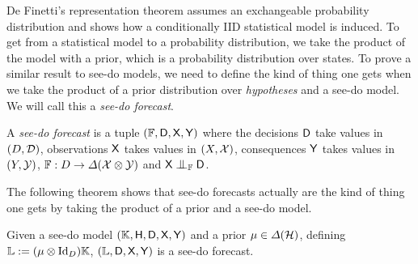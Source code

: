 De Finetti's representation theorem assumes an exchangeable probability distribution and shows how a conditionally IID statistical model is induced. To get from a statistical model to a probability distribution, we take the product of the model with a prior, which is a probability distribution over states. To prove a similar result to see-do models, we need to define the kind of thing one gets when we take the product of a prior distribution over \emph{hypotheses} and a see-do model. We will call this a \emph{see-do forecast}.

\begin{definition}\label{def:do_forecast}
A \emph{see-do forecast} is a tuple $(\mathbb{F},\mathsf{D},\mathsf{X},\mathsf{Y})$ where the decisions $\mathsf{D}$ take values in $(D,\mathcal{D})$, observations $\mathsf{X}$ takes values in $(X,\mathcal{X})$, consequences $\mathsf{Y}$ takes values in $(Y,\mathcal{Y})$, $\mathbb{F}:D\to \Delta(\mathcal{X}\otimes \mathcal{Y})$ and $\RV{X}\CI_{\kernel{F}}\RV{D}$.
\end{definition}

The following theorem shows that see-do forecasts actually are the kind of thing one gets by taking the product of a prior and a see-do model.

\begin{theorem}
Given a see-do model $(\mathbb{K},\mathsf{H},\mathsf{D},\mathsf{X},\mathsf{Y})$ and a prior $\mu\in \Delta(\mathcal{H})$, defining $\mathbb{L}:=(\mu\otimes \mathrm{Id}_D)\mathbb{K}$, $(\mathbb{L},\mathsf{D},\mathsf{X},\mathsf{Y})$ is a see-do forecast. 
\end{theorem}

